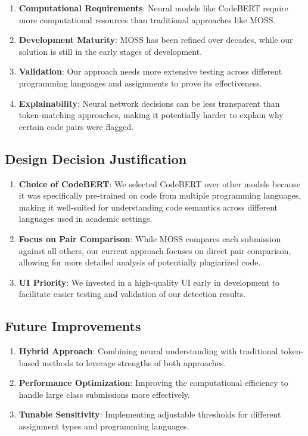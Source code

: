 \documentclass[12pt, titlepage]{article}
\begin{document}
\begin{enumerate}
    \item \textbf{Computational Requirements}: Neural models like CodeBERT require more computational resources than traditional approaches like MOSS.

    \item \textbf{Development Maturity}: MOSS has been refined over decades, while our solution is still in the early stages of development.

    \item \textbf{Validation}: Our approach needs more extensive testing across different programming languages and assignments to prove its effectiveness.

    \item \textbf{Explainability}: Neural network decisions can be less transparent than token-matching approaches, making it potentially harder to explain why certain code pairs were flagged.
\end{enumerate}

\subsection{Design Decision Justification}

\begin{enumerate}
    \item \textbf{Choice of CodeBERT}: We selected CodeBERT over other models because it was specifically pre-trained on code from multiple programming languages, making it well-suited for understanding code semantics across different languages used in academic settings.

    \item \textbf{Focus on Pair Comparison}: While MOSS compares each submission against all others, our current approach focuses on direct pair comparison, allowing for more detailed analysis of potentially plagiarized code.

    \item \textbf{UI Priority}: We invested in a high-quality UI early in development to facilitate easier testing and validation of our detection results.
\end{enumerate}

\subsection{Future Improvements}

\begin{enumerate}
    \item \textbf{Hybrid Approach}: Combining neural understanding with traditional token-based methods to leverage strengths of both approaches.

    \item \textbf{Performance Optimization}: Improving the computational efficiency to handle large class submissions more effectively.

    \item \textbf{Tunable Sensitivity}: Implementing adjustable thresholds for different assignment types and programming languages.
\end{enumerate}
\end{document}
